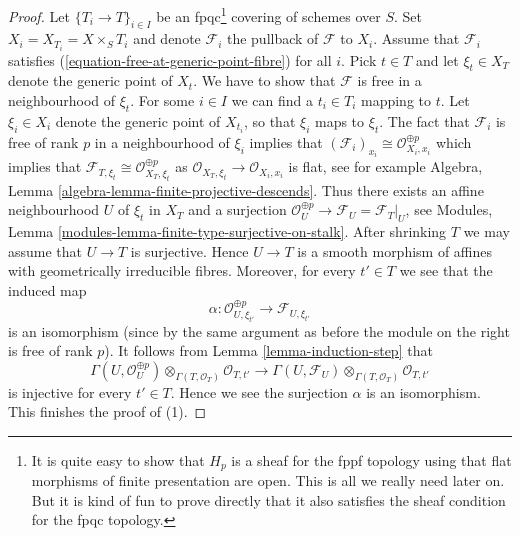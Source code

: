 \begin{proof}
Let $\{T_i \to T\}_{i \in I}$ be an fpqc\footnote{It is quite easy to
show that $H_p$
is a sheaf for the fppf topology using that flat morphisms of finite
presentation are open. This is all we really need later on. But it is kind
of fun to prove directly that it also satisfies the sheaf condition
for the fpqc topology.} covering of schemes over $S$.
Set $X_i = X_{T_i} = X \times_S T_i$ and denote $\mathcal{F}_i$ the
pullback of $\mathcal{F}$ to $X_i$. Assume that $\mathcal{F}_i$ satisfies
(\ref{equation-free-at-generic-point-fibre}) for all $i$.
Pick $t \in T$ and let $\xi_t \in X_T$ denote the generic point of $X_t$.
We have to show that $\mathcal{F}$ is free in a neighbourhood of $\xi_t$.
For some $i \in I$ we can find a $t_i \in T_i$ mapping to $t$.
Let $\xi_i \in X_i$ denote the generic point of $X_{t_i}$, so that
$\xi_i$ maps to $\xi_t$. The fact that $\mathcal{F}_i$ is free of rank
$p$ in a neighbourhood of $\xi_i$ implies that
$(\mathcal{F}_i)_{x_i} \cong \mathcal{O}_{X_i, x_i}^{\oplus p}$
which implies that
$\mathcal{F}_{T, \xi_t} \cong \mathcal{O}_{X_T, \xi_t}^{\oplus p}$
as $\mathcal{O}_{X_T, \xi_t} \to \mathcal{O}_{X_i, x_i}$ is flat, see
for example
Algebra, Lemma \ref{algebra-lemma-finite-projective-descends}.
Thus there exists an affine neighbourhood $U$ of $\xi_t$ in $X_T$
and a surjection
$\mathcal{O}_U^{\oplus p} \to \mathcal{F}_U = \mathcal{F}_T|_U$, see
Modules, Lemma \ref{modules-lemma-finite-type-surjective-on-stalk}.
After shrinking $T$ we may assume that $U \to T$ is surjective. Hence
$U \to T$ is a smooth morphism of affines with geometrically irreducible
fibres. Moreover, for every $t' \in T$ we see that the induced map
$$
\alpha :
\mathcal{O}_{U, \xi_{t'}}^{\oplus p}
\longrightarrow
\mathcal{F}_{U, \xi_{t'}}
$$
is an isomorphism (since by the same argument as before the module on the right
is free of rank $p$). It follows from
Lemma \ref{lemma-induction-step}
that
$$
\Gamma(U, \mathcal{O}_U^{\oplus p})
\otimes_{\Gamma(T, \mathcal{O}_T)} \mathcal{O}_{T, t'}
\longrightarrow
\Gamma(U, \mathcal{F}_U)
\otimes_{\Gamma(T, \mathcal{O}_T)} \mathcal{O}_{T, t'}
$$
is injective for every $t' \in T$. Hence we see the surjection $\alpha$ is an
isomorphism. This finishes the proof of (1).


\end{proof}
